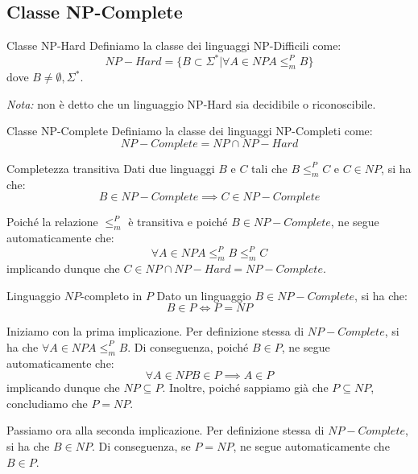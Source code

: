 \subsection{Classe NP-Complete}
\begin{Definition}{Classe NP-Hard}{}
Definiamo la classe dei linguaggi NP-Difficili come:
\begin{equation*}
NP-Hard = \{B\subset\Sigma^*| \forall A \in NP A \leq^P_m B\}
\end{equation*}
dove $B\neq \emptyset, \Sigma^*$.

\textit{Nota:} non è detto che un linguaggio NP-Hard sia decidibile o riconoscibile.    
\end{Definition}

\begin{Definition}{Classe NP-Complete}{}
Definiamo la classe dei linguaggi NP-Completi come:
\begin{equation*}
    NP-Complete = NP\cap NP-Hard    
\end{equation*}
\end{Definition}

\begin{Thm}{Completezza transitiva}{}
Dati due linguaggi $B$ e $C$ tali che $B \leq^P_m C$ e $C \in NP$, si ha che:
\begin{equation*}
    B \in NP-Complete\implies C \in NP-Complete    
\end{equation*}

\begin{demonstration}
Poiché la relazione $\leq^P_m$ è transitiva e poiché $B \in NP-Complete$, ne segue automaticamente che:
\begin{equation*}
\forall A \in NP A \leq^P_m B \leq^P_m C
\end{equation*}
implicando dunque che $C \in NP\cap NP-Hard = NP-Complete$.
\end{demonstration}
\end{Thm}

\begin{Thm}{Linguaggio $NP$-completo in $P$}{}
Dato un linguaggio $B\in NP-Complete$, si ha che:
\begin{equation*}
    B\in P\iff P = NP    
\end{equation*}

\begin{demonstration}
Iniziamo con la prima implicazione. Per definizione stessa di $NP-Complete$, si ha che $\forall A\in NP A\leq^P_m B$. Di conseguenza, poiché $B\in P$, ne segue automaticamente che:
\begin{equation*}
    \forall A\in NP B\in P\implies A\in P    
\end{equation*}
implicando dunque che $NP\subseteq P$. Inoltre, poiché sappiamo già che $P\subseteq NP$, concludiamo che $P = NP$.

Passiamo ora alla seconda implicazione. Per definizione stessa di $NP-Complete$, si ha che $B\in NP$. Di conseguenza, se $P = NP$, ne segue automaticamente che $B\in P$.    
\end{demonstration}
\end{Thm}

